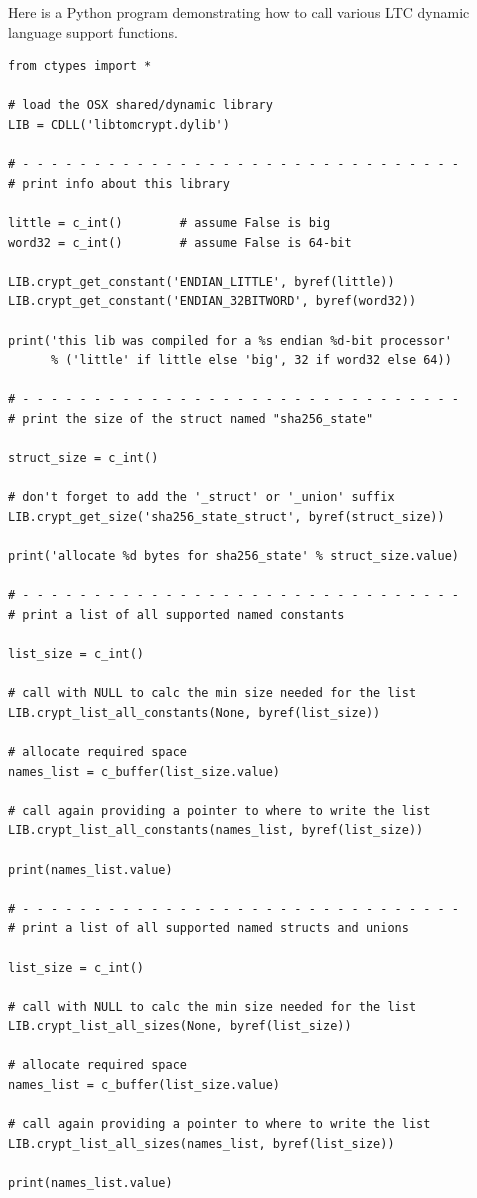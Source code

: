 \documentclass[synpaper]{book}
\begin{document}
Here is a Python program demonstrating how to call various LTC dynamic
language support functions.
\begin{verbatim}
from ctypes import *

# load the OSX shared/dynamic library
LIB = CDLL('libtomcrypt.dylib')

# - - - - - - - - - - - - - - - - - - - - - - - - - - - - - - -
# print info about this library

little = c_int()        # assume False is big
word32 = c_int()        # assume False is 64-bit

LIB.crypt_get_constant('ENDIAN_LITTLE', byref(little))
LIB.crypt_get_constant('ENDIAN_32BITWORD', byref(word32))

print('this lib was compiled for a %s endian %d-bit processor'
      % ('little' if little else 'big', 32 if word32 else 64))

# - - - - - - - - - - - - - - - - - - - - - - - - - - - - - - -
# print the size of the struct named "sha256_state"

struct_size = c_int()

# don't forget to add the '_struct' or '_union' suffix
LIB.crypt_get_size('sha256_state_struct', byref(struct_size))

print('allocate %d bytes for sha256_state' % struct_size.value)

# - - - - - - - - - - - - - - - - - - - - - - - - - - - - - - -
# print a list of all supported named constants

list_size = c_int()

# call with NULL to calc the min size needed for the list
LIB.crypt_list_all_constants(None, byref(list_size))

# allocate required space
names_list = c_buffer(list_size.value)

# call again providing a pointer to where to write the list
LIB.crypt_list_all_constants(names_list, byref(list_size))

print(names_list.value)

# - - - - - - - - - - - - - - - - - - - - - - - - - - - - - - -
# print a list of all supported named structs and unions

list_size = c_int()

# call with NULL to calc the min size needed for the list
LIB.crypt_list_all_sizes(None, byref(list_size))

# allocate required space
names_list = c_buffer(list_size.value)

# call again providing a pointer to where to write the list
LIB.crypt_list_all_sizes(names_list, byref(list_size))

print(names_list.value)
\end{verbatim}
\end{document}
